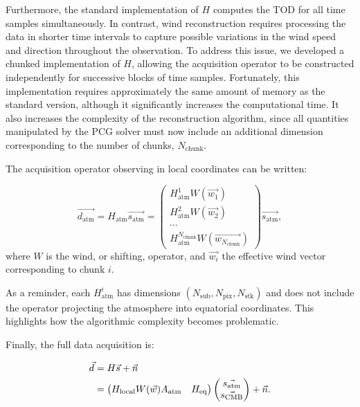 \documentclass[a4paper,11pt]{article}
\begin{document}
Furthermore, the standard implementation of $H$ computes the TOD for all time samples simultaneously. In contrast, wind reconstruction requires processing the data in shorter time intervals to capture possible variations in the wind speed and direction throughout the observation. To address this issue, we developed a chunked implementation of $H$, allowing the acquisition operator to be constructed independently for successive blocks of time samples. Fortunately, this implementation requires approximately the same amount of memory as the standard version, although it significantly increases the computational time. It also increases the complexity of the reconstruction algorithm, since all quantities manipulated by the PCG solver must now include an additional dimension corresponding to the number of chunks, $N_{\mathrm{chunk}}$.

The acquisition operator observing in local coordinates can be written:

\begin{equation}
    \vec{d_\text{atm}} = H_\text{atm}\vec{s_\text{atm}} = \begin{pmatrix}
        H_{\text{atm}}^{1} W(\vec{w_1}) \\
        H_{\text{atm}}^{2} W(\vec{w_2}) \\
        \cdots \\
        H_{\text{atm}}^{N_\text{chunk}} W(\vec{w_{N_\text{chunk}}})
        \end{pmatrix} \vec{s_\text{atm}},
\end{equation}
where $W$ is the wind, or shifting, operator, and $\vec{w_i}$ the effective wind vector corresponding to chunk $i$.

As a reminder, each $H_{\text{atm}}^{i}$ has dimensions $\left(N_\text{sub}, N_\text{pix}, N_\text{stk}\right)$ and does not include the operator projecting the atmosphere into equatorial coordinates. This highlights how the algorithmic complexity becomes problematic.

Finally, the full data acquisition is:

\begin{align} \label{eq:atm_data_model}
    \vec{d} &= H\vec{s} + \vec{n} \notag \\
    &= \begin{pmatrix}
        H_\text{local} W(\vec{w}) A_\text{atm} & H_\text{eq}
    \end{pmatrix} \begin{pmatrix}
        \vec{s_\text{atm}} \\
        \vec{s_\text{CMB}}
    \end{pmatrix} + \vec{n}.
\end{align}
\end{document}
